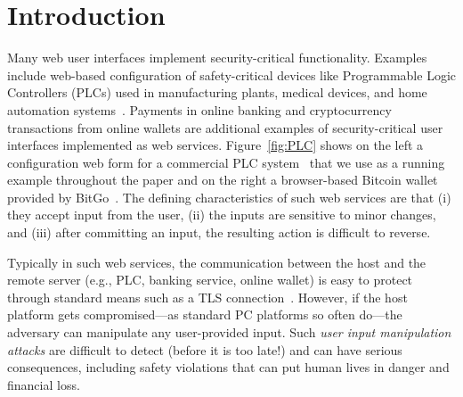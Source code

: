 \section{Introduction}
\label{sec:introduction}

Many web user interfaces implement security-critical functionality. Examples include web-based configuration of safety-critical devices like Programmable Logic Controllers (PLCs) used in manufacturing plants, medical devices, and home automation systems~\cite{7306669,siemens,siemens2,schneider}. Payments in online banking and cryptocurrency transactions from online wallets are additional examples of security-critical user interfaces implemented as web services. Figure~\ref{fig:PLC} shows on the left a configuration web form for a commercial PLC system~\cite{controlbyweb} that we use as a running example throughout the paper and on the right a browser-based Bitcoin wallet provided by BitGo~\cite{bitgo}. The defining characteristics of such web services are that (i) they accept input from the user, (ii) the inputs are sensitive to minor changes, and (iii) after committing an input, the resulting action is difficult to reverse.


Typically in such web services, the communication between the host and the remote server (e.g., PLC, banking service, online wallet) is easy to protect through standard means such as a TLS connection~\cite{dierks2008transport}. However, if the host platform gets compromised---as standard PC platforms so often do---the adversary can manipulate any user-provided input. Such \emph{user input manipulation attacks} are difficult to detect (before it is too late!) and can have serious consequences, including safety violations that can put human lives in danger and financial loss. 

